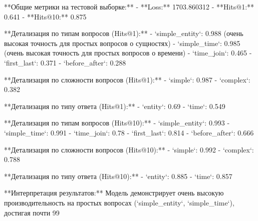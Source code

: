 \documentclass{article}
\begin{document}
**Общие метрики на тестовой выборке:**
-   **Loss:** 1703.860312
-   **Hits@1:** 0.641
-   **Hits@10:** 0.875

**Детализация по типам вопросов (Hits@1):**
-   `simple_entity`: 0.988 (очень высокая точность для простых вопросов о сущностях)
-   `simple_time`: 0.985 (очень высокая точность для простых вопросов о времени)
-   `time_join`: 0.465
-   `first_last`: 0.371
-   `before_after`: 0.288

**Детализация по сложности вопросов (Hits@1):**
-   `simple`: 0.987
-   `complex`: 0.382

**Детализация по типу ответа (Hits@1):**
-   `entity`: 0.69
-   `time`: 0.549

**Детализация по типам вопросов (Hits@10):**
-   `simple_entity`: 0.993
-   `simple_time`: 0.991
-   `time_join`: 0.78
-   `first_last`: 0.814
-   `before_after`: 0.666

**Детализация по сложности вопросов (Hits@10):**
-   `simple`: 0.992
-   `complex`: 0.788

**Детализация по типу ответа (Hits@10):**
-   `entity`: 0.885
-   `time`: 0.857

**Интерпретация результатов:**
Модель демонстрирует очень высокую производительность на простых вопросах (`simple_entity`, `simple_time`), достигая почти 99%
\end{document}
